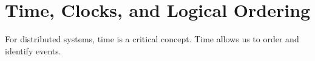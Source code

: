 \newpage

\section{Time, Clocks, and Logical Ordering}

\noindent
For distributed systems, time is a critical concept. Time allows us to order and identify events. 